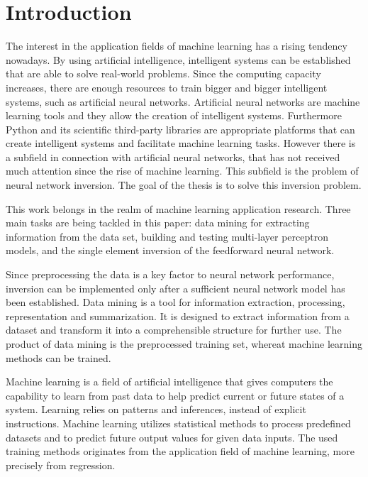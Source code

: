 \chapter{Introduction}

The interest in the application fields of machine learning has a rising tendency nowadays. By using artificial intelligence, intelligent systems can be established that are able to solve real-world problems. Since the computing capacity increases, there are enough resources to train bigger and bigger intelligent systems, such as artificial neural networks. Artificial neural networks are machine learning tools and they allow the creation of intelligent systems. Furthermore Python and its scientific third-party libraries are appropriate platforms that can create intelligent systems and facilitate machine learning tasks. However there is a subfield in connection with artificial neural networks, that has not received much attention since the rise of machine learning. This subfield is the problem of neural network inversion. The goal of the thesis is to solve this inversion problem. \medskip

This work belongs in the realm of machine learning application research. Three main tasks are being tackled in this paper: data mining for extracting information from the data set, building and testing multi-layer perceptron models, and the single element  inversion of the feedforward neural network.\medskip

Since preprocessing the data is a key factor to neural network performance, inversion can be implemented only after a sufficient neural network model has been established. Data mining is a tool for information extraction, processing, representation and summarization. It is designed to extract information from a dataset and transform it into a comprehensible structure for further use. The product of data mining is the preprocessed training set, whereat machine learning methods can be trained. \medskip

Machine learning is a field of artificial intelligence that gives computers the capability to learn from past data to help predict current or future states of a system. Learning relies on patterns and inferences, instead of explicit instructions. Machine learning utilizes statistical methods to process predefined datasets and to predict future output values for given data inputs. The used training methods originates from the application field of machine learning, more precisely from regression. \smallskip

